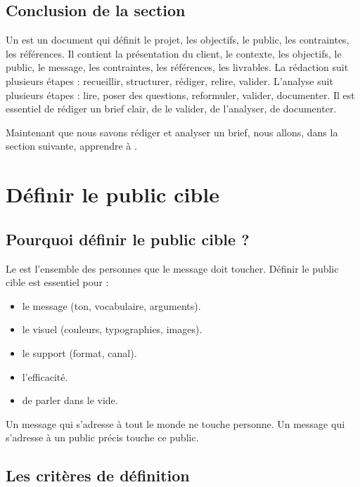 \subsection*{Conclusion de la section}

Un  est un document qui définit le projet, les objectifs, le public, les contraintes, les références. Il contient la présentation du client, le contexte, les objectifs, le public, le message, les contraintes, les références, les livrables. La rédaction suit plusieurs étapes : recueillir, structurer, rédiger, relire, valider. L'analyse suit plusieurs étapes : lire, poser des questions, reformuler, valider, documenter. Il est essentiel de rédiger un brief clair, de le valider, de l'analyser, de documenter.

Maintenant que nous savons rédiger et analyser un brief, nous allons, dans la section suivante, apprendre à .

\section{Définir le public cible}

\subsection{Pourquoi définir le public cible ?}

Le  est l'ensemble des personnes que le message doit toucher. Définir le public cible est essentiel pour :

\begin{itemize}
    \item {} le message (ton, vocabulaire, arguments).
    \item {} le visuel (couleurs, typographies, images).
    \item {} le support (format, canal).
    \item {} l'efficacité.
    \item {} de parler dans le vide.
\end{itemize}

Un message qui s'adresse à tout le monde ne touche personne. Un message qui s'adresse à un public précis touche ce public.

\subsection{Les critères de définition}

